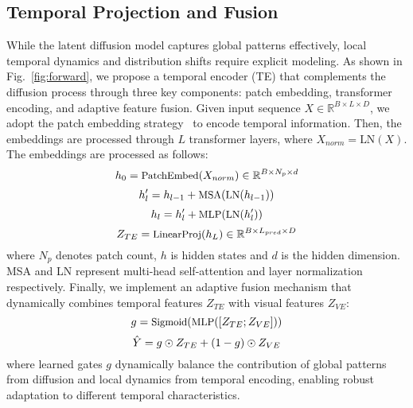 \subsection{Temporal Projection and Fusion}
While the latent diffusion model captures global patterns effectively, local temporal dynamics and distribution shifts require explicit modeling. As shown in Fig.~\ref{fig:forward}, we propose a temporal encoder (TE) that complements the diffusion process through three key components: patch embedding, transformer encoding, and adaptive feature fusion.
Given input sequence $X \in \mathbb{R}^{B \times L \times D}$, we adopt the patch embedding strategy~\cite{dosovitskiy2020image,nie2023patchtst} to encode temporal information. Then, the embeddings are processed through $L$ transformer layers, where $X_{norm} = \text{LN}(X)$. The embeddings are processed as follows:
\begin{equation}
\small
    h_0 = \text{PatchEmbed}(X_{norm})\in \mathbb{R}^{B \times N_p \times d}
\end{equation}
\begin{equation}
\small
    h'_l = h_{l-1} + \text{MSA}(\text{LN}(h_{l-1}))
\end{equation}
\begin{equation}
\small
    h_l = h'_l + \text{MLP}(\text{LN}(h'_l))
\end{equation}
\begin{equation}
\small
    Z_{TE} = \text{LinearProj}(h_L) \in \mathbb{R}^{B \times L_{pred} \times D}
\end{equation}
where $N_p$ denotes patch count, $h$ is hidden states and $d$ is the hidden dimension. MSA and LN represent multi-head self-attention and layer normalization respectively. Finally, we implement an adaptive fusion mechanism that dynamically combines temporal features $Z_{TE}$ with visual features $Z_{VE}$:
\begin{equation}
\small
    g = \text{Sigmoid}(\text{MLP}([Z_{TE}; Z_{VE}])) 
\end{equation}
\begin{equation}
\small
    \hat{Y} = g \odot Z_{TE} + (1-g) \odot Z_{VE}
\end{equation}
where learned gates $g$ dynamically balance the contribution of global patterns from diffusion and local dynamics from temporal encoding, enabling robust adaptation to different temporal characteristics.